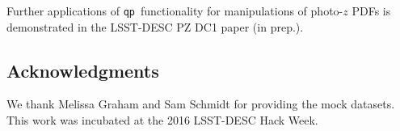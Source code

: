 \documentclass[\docopts]{\docclass}
\newcommand{\qp}{\texttt{qp}}
\newcommand{\pz}{photo-$z$ PDF}
\begin{document}
Further applications of \qp\ functionality for manipulations of \pz s is 
demonstrated in the LSST-DESC PZ DC1 paper (in prep.).

\subsection*{Acknowledgments}


We thank Melissa Graham and Sam Schmidt for providing the mock datasets.  This 
work was incubated at the 2016 LSST-DESC Hack Week.







\end{document}
